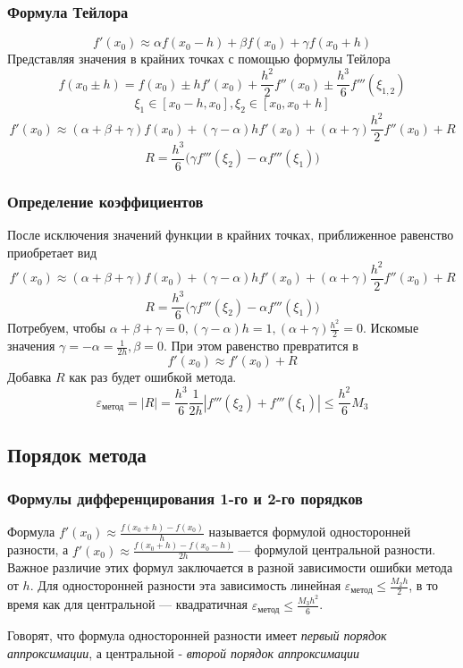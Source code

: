 \documentclass[aspectratio=43,unicode]{beamer}
\begin{document}
\begin{frame}
\frametitle{Формула Тейлора}
	\[
	f'(x_0) \approx \alpha f(x_0-h)  + \beta f(x_0) + \gamma f(x_0+h)
	\]
	Представляя значения в крайних точках с помощью формулы Тейлора
	\[
	f(x_0 \pm h) = f(x_0) \pm h f'(x_0) + \frac{h^2}{2} f''(x_0) \pm \frac{h^3}{6} f'''(\xi_{1,2})
	\]
	\[
	\xi_1 \in [x_0-h, x_0],\xi_2 \in [x_0, x_0+h]
	\]
	\[
	f'(x_0) \approx (\alpha + \beta + \gamma) f(x_0) + (\gamma - \alpha) h f'(x_0) + (\alpha+\gamma) \frac{h^2}{2}f''(x_0) + R
	\]
	\[
	R = \frac{h^3}{6}\Big(\gamma f'''(\xi_2) - \alpha f'''(\xi_1)\Big)
	\]
\end{frame}

\begin{frame}
\frametitle{Определение коэффициентов}
	После исключения значений функции в крайних точках, приближенное равенство приобретает вид
	\[
	f'(x_0) \approx (\alpha + \beta + \gamma) f(x_0) + (\gamma - \alpha) h f'(x_0) + (\alpha+\gamma) \frac{h^2}{2}f''(x_0) + R
	\]
	\[
	R = \frac{h^3}{6}\Big(\gamma f'''(\xi_2) - \alpha f'''(\xi_1)\Big)
	\]
	Потребуем, чтобы $\alpha + \beta + \gamma = 0, (\gamma - \alpha) h = 1, (\alpha+\gamma) \frac{h^2}{2} = 0$.
	Искомые значения $\gamma = -\alpha = \frac{1}{2h}, \beta = 0$.
	При этом равенство превратится в
	\[
	f'(x_0) \approx f'(x_0) + R
	\]
	Добавка $R$ как раз будет ошибкой метода.
	\[
	\varepsilon_{\text{метод}} = |R| = \frac{h^3}{6} \frac{1}{2h}|f'''(\xi_2) + f'''(\xi_1)| \leqslant \frac{h^2}{6} M_3
	\]
\end{frame}

\subsection{Порядок метода}
\begin{frame}
\frametitle{Формулы дифференцирования 1-го и 2-го порядков}
	Формула $f'(x_0) \approx \frac{f(x_0+h) - f(x_0)}{h}$ называется формулой односторонней разности, а
	$f'(x_0) \approx \frac{f(x_0 + h) - f(x_0 - h)}{2h}$ --- формулой центральной разности. Важное различие этих формул заключается
	в разной зависимости ошибки метода от $h$. Для односторонней разности эта зависимость линейная
	$\varepsilon_{\text{метод}} \leqslant \frac{M_2 h}{2}$, в то время как для центральной --- квадратичная
	$\varepsilon_{\text{метод}} \leqslant \frac{M_3 h^2}{6}$.
	\pause

	Говорят, что формула односторонней разности имеет \emph{первый порядок аппроксимации},
	а центральной - \emph{второй порядок аппроксимации}
\end{frame}
\end{document}
